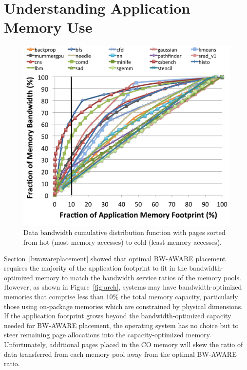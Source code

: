 \section{Understanding Application Memory Use}
\label{constrainedcapacity}

\begin{figure}[t]
    \centering
    \includegraphics[width=0.9\columnwidth]{asplos2015/figures/cdf.png} 
    \caption{Data bandwidth cumulative distribution function with pages sorted from hot (most memory accesses) to cold (least memory accesses).}
    \label{fig:cdf}
\end{figure}

Section~\ref{bwawareplacement} showed that optimal BW-AWARE placement requires
the majority of the application footprint to fit in the bandwidth-optimized memory
to match the bandwidth service ratios of the memory pools.
However, as shown in Figure~\ref{fig:arch}, systems may have bandwidth-optimized
memories that comprise less than 10\% the total memory capacity, particularly those using
on-package memories which are constrained by physical dimensions. If the application footprint
grows beyond the bandwidth-optimized capacity needed for BW-AWARE placement, the operating system
has no choice but to steer remaining page allocations into the capacity-optimized memory.
Unfortunately, additional pages placed in the CO memory will skew the
ratio of data transferred from each memory pool away from the optimal BW-AWARE ratio.


